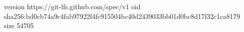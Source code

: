 version https://git-lfs.github.com/spec/v1
oid sha256:bd0cb74a9c4fab97922f4fc915504bc40d2439033bb01d0bc8d17f32c1ca8179
size 54705
